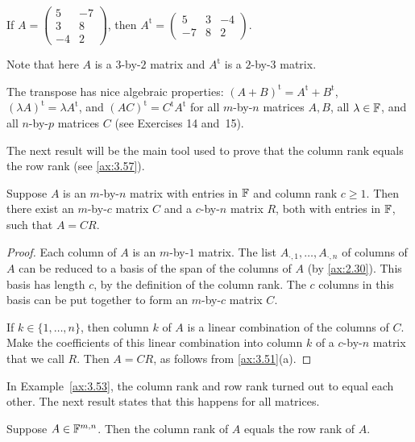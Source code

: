 \begin{example}\label{ax:3.55}
If $A=\begin{pmatrix} 5 & -7\\ 3 & 8\\ -4 & 2 \end{pmatrix}$, then
$A^{\mathrm{t}}=\begin{pmatrix} 5 & 3 & -4\\ -7 & 8 & 2 \end{pmatrix}$.

Note that here $A$ is a $3$-by-$2$ matrix and $A^{\mathrm{t}}$ is a
$2$-by-$3$ matrix.
\end{example}

The transpose has nice algebraic properties:
$(A+B)^{\mathrm{t}}=A^{\mathrm{t}}+B^{\mathrm{t}}$,
$(\lambda A)^{\mathrm{t}}=\lambda A^{\mathrm{t}}$, and
$(AC)^{\mathrm{t}}=C^{\mathrm{t}}A^{\mathrm{t}}$ for all $m$-by-$n$ matrices
$A,B$, all $\lambda\in\mathbb{F}$, and all $n$-by-$p$ matrices $C$ (see Exercises 14
and~15).

The next result will be the main tool used to prove that the column rank equals
the row rank (see \ref{ax:3.57}).

\begin{result}\label{ax:3.56}
Suppose $A$ is an $m$-by-$n$ matrix with entries in $\mathbb{F}$ and column rank
$c\ge1$. Then there exist an $m$-by-$c$ matrix $C$ and a $c$-by-$n$ matrix $R$,
both with entries in $\mathbb{F}$, such that $A=CR$.
\end{result}

\begin{proof}
Each column of $A$ is an $m$-by-$1$ matrix. The list
$A_{\cdot,1},\dots,A_{\cdot,n}$ of columns of $A$ can be reduced to a basis of
the span of the columns of $A$ (by \ref{ax:2.30}). This basis has length $c$,
by the definition of the column rank. The $c$ columns in this basis can be put
together to form an $m$-by-$c$ matrix $C$.

If $k\in\{1,\dots,n\}$, then column $k$ of $A$ is a linear combination of the
columns of $C$. Make the coefficients of this linear combination into column
$k$ of a $c$-by-$n$ matrix that we call $R$. Then $A=CR$, as follows from
\ref{ax:3.51}(a).
\end{proof}

In Example~\ref{ax:3.53}, the column rank and row rank turned out to equal each
other. The next result states that this happens for all matrices.

\begin{result}\label{ax:3.57}
Suppose $A\in\mathbb{F}^{m,n}$. Then the column rank of $A$ equals the row rank of $A$.
\end{result}


